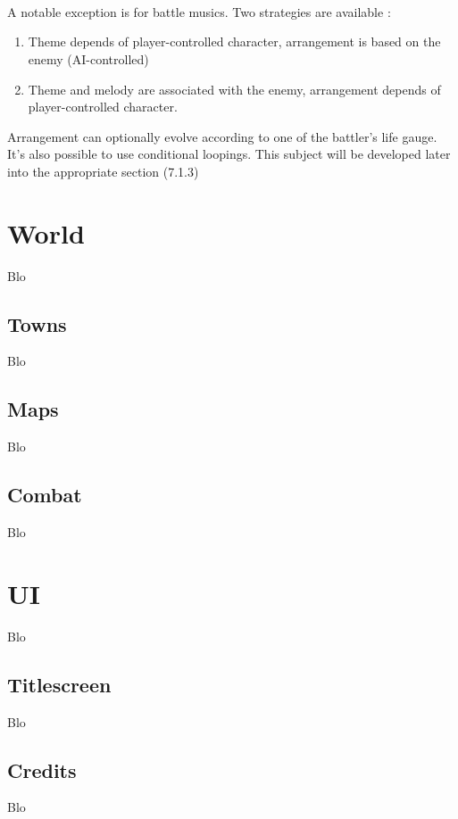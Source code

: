 \documentclass[a4paper,12pt]{book}
\begin{document}
\\ \\ \\
A notable exception is for battle musics. Two strategies are available :
\begin{enumerate}
	\item Theme depends of player-controlled character, arrangement is based on the enemy (AI-controlled)
	\item Theme and melody are associated with the enemy, arrangement depends of player-controlled character. 
\end{enumerate}
Arrangement can optionally evolve according to one of the battler's life gauge. It's also possible to use conditional loopings. This subject will be developed later into the appropriate section (7.1.3)
\section{World}
Blo
\subsection{Towns}
Blo
\subsection{Maps}
Blo
\subsection{Combat}
Blo
\section{UI}
Blo
\subsection{Titlescreen}
Blo
\subsection{Credits}
Blo
\end{document}

